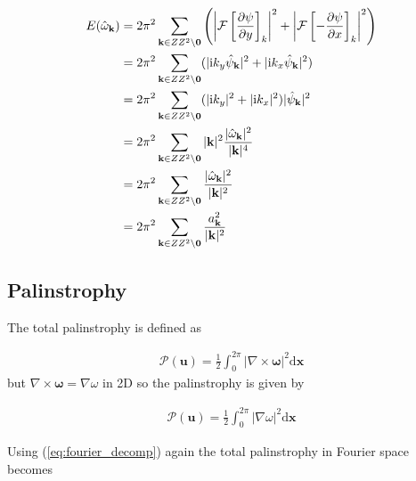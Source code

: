 \documentclass[9pt]{article}
\newcommand{\pder}[2]{\frac{\partial #1}{\partial #2}}               %
\newcommand{\ii}{\mathrm{i}}      								  %
\newcommand{\grad}[1]{\nabla{#1}}								%
\newcommand{\curl}[1]{\nabla \times {#1}}								%
\newcommand{\bfu}{\mathbf{u}}											%
\newcommand{\bfx}{\mathbf{x}}								%
\newcommand{\bfk}{\mathbf{k}}								%
\begin{document}
\begin{align}
E(\hat{\omega}_{\bfk}) &=  2\pi^2 \sum_{\mathbf{k}\in \mathbb{Z}^2\setminus \mathbf{0}} \left(\left|\mathcal{F}\left[\pder{\psi}{y}\right]_k\right|^2 + \left|\mathcal{F}\left[-\pder{\psi}{x}\right]_k\right|^2 \right) \notag \\
&= 2\pi^2 \sum_{\mathbf{k}\in \mathbb{Z}^2\setminus \mathbf{0}} (|\ii k_{y}\hat{\psi}_{\mathbf{k}}|^2 + |\ii k_x \hat{\psi}_{\mathbf{k}}|^2) \notag \\
&= 2\pi^2 \sum_{\mathbf{k}\in \mathbb{Z}^2\setminus \mathbf{0}} (|\ii k_{y}|^2 + |\ii k_x|^2)|\hat{\psi}_{\mathbf{k}}|^2 \notag \\
&= 2\pi^2 \sum_{\mathbf{k}\in \mathbb{Z}^2\setminus \mathbf{0}} |\bfk|^2\frac{|\hat{\omega}_{\mathbf{k}}|^2}{|\bfk|^4} \notag \\
&= 2\pi^2 \sum_{\mathbf{k}\in \mathbb{Z}^2\setminus \mathbf{0}} \frac{|\hat{\omega}_{\mathbf{k}}|^2}{|\bfk|^2} \notag \\
&= 2\pi^2 \sum_{\mathbf{k}\in \mathbb{Z}^2\setminus \mathbf{0}} \frac{a_{\mathbf{k}}^2}{|\bfk|^2}
\label{eq:energy_w_fourier}
\end{align}

\subsection{Palinstrophy}

 The total palinstrophy is defined as 

 \begin{align}
 \mathcal{P}(\bfu) = \frac{1}{2}\int_0^{2\pi} |\curl{\bm{\omega}}|^2\mathrm{d}\bfx
 \end{align}	
but $\curl{\bm{\omega}} = \grad{\omega}$ in 2D so the palinstrophy is given by

\begin{align}
\mathcal{P}(\bfu) = \frac{1}{2}\int_0^{2\pi} |\grad{\omega}|^2\mathrm{d}\bfx
\end{align}

Using (\ref{eq:fourier_decomp}) again the total palinstrophy in Fourier space becomes
\end{document}
